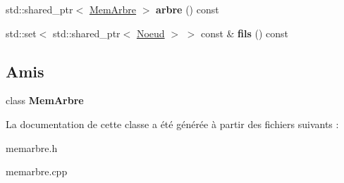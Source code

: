 \begin{DoxyCompactItemize}
\item 
std\+::shared\+\_\+ptr$<$ \hyperlink{classMemArbre}{Mem\+Arbre} $>$ {\bfseries arbre} () const \hypertarget{classMemArbre_1_1Noeud_a3e4c43603bc73e9b3c59c4f484d66436}{}\label{classMemArbre_1_1Noeud_a3e4c43603bc73e9b3c59c4f484d66436}

\item 
std\+::set$<$ std\+::shared\+\_\+ptr$<$ \hyperlink{classMemArbre_1_1Noeud}{Noeud} $>$ $>$ const \& {\bfseries fils} () const \hypertarget{classMemArbre_1_1Noeud_a7c627d3c87dac568a9d39d8f65516626}{}\label{classMemArbre_1_1Noeud_a7c627d3c87dac568a9d39d8f65516626}

\end{DoxyCompactItemize}
\subsection*{Amis}
\begin{DoxyCompactItemize}
\item 
class {\bfseries Mem\+Arbre}\hypertarget{classMemArbre_1_1Noeud_a2828cd0bf50a0db376c8e9b9eeda2637}{}\label{classMemArbre_1_1Noeud_a2828cd0bf50a0db376c8e9b9eeda2637}

\end{DoxyCompactItemize}


La documentation de cette classe a été générée à partir des fichiers suivants \+:\begin{DoxyCompactItemize}
\item 
memarbre.\+h\item 
memarbre.\+cpp\end{DoxyCompactItemize}
